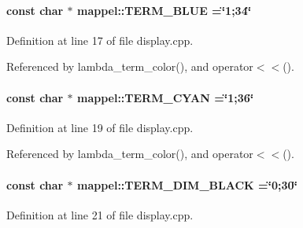 \paragraph[{\texorpdfstring{T\+E\+R\+M\+\_\+\+B\+L\+UE}{TERM_BLUE}}]{\setlength{\rightskip}{0pt plus 5cm}const char $\ast$ mappel\+::\+T\+E\+R\+M\+\_\+\+B\+L\+UE =\char`\"{}1;34\char`\"{}}\hypertarget{namespacemappel_a04365b9f87e9c572c79e2da4ff4a0378}{}\label{namespacemappel_a04365b9f87e9c572c79e2da4ff4a0378}


Definition at line 17 of file display.\+cpp.



Referenced by lambda\+\_\+term\+\_\+color(), and operator$<$$<$().

\paragraph[{\texorpdfstring{T\+E\+R\+M\+\_\+\+C\+Y\+AN}{TERM_CYAN}}]{\setlength{\rightskip}{0pt plus 5cm}const char $\ast$ mappel\+::\+T\+E\+R\+M\+\_\+\+C\+Y\+AN =\char`\"{}1;36\char`\"{}}\hypertarget{namespacemappel_ad7696c53e61084d23f8532598b261c36}{}\label{namespacemappel_ad7696c53e61084d23f8532598b261c36}


Definition at line 19 of file display.\+cpp.



Referenced by lambda\+\_\+term\+\_\+color(), and operator$<$$<$().

\paragraph[{\texorpdfstring{T\+E\+R\+M\+\_\+\+D\+I\+M\+\_\+\+B\+L\+A\+CK}{TERM_DIM_BLACK}}]{\setlength{\rightskip}{0pt plus 5cm}const char $\ast$ mappel\+::\+T\+E\+R\+M\+\_\+\+D\+I\+M\+\_\+\+B\+L\+A\+CK =\char`\"{}0;30\char`\"{}}\hypertarget{namespacemappel_a233d1d0ed4c3957ba68364c5d9f6f45e}{}\label{namespacemappel_a233d1d0ed4c3957ba68364c5d9f6f45e}


Definition at line 21 of file display.\+cpp.

